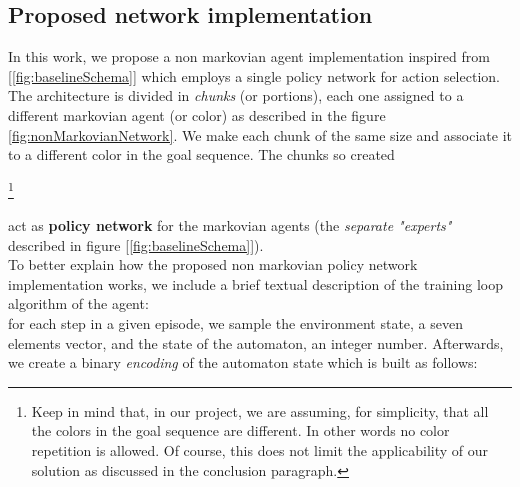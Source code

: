 \documentclass{article}
\begin{document}
\subsection{Proposed network implementation}
In this work, we propose a non markovian agent implementation inspired from [\ref{fig:baselineSchema}] which employs a single policy network for action selection. The architecture is divided in \textit{chunks} (or portions), each one assigned to a different markovian agent (or color) as described in the figure \ref{fig:nonMarkovianNetwork}.
We make each chunk of the same size and associate it to a different color in the goal sequence. The chunks so created


\footnote{Keep in mind that, in our project, we are assuming, for simplicity, that all the colors in the goal sequence are different. In other words no color repetition is allowed. Of course, this does not limit the applicability of our solution as discussed in the conclusion paragraph.} 

act as \textbf{policy network} for the markovian agents (the \textit{separate "experts"} described in figure [\ref{fig:baselineSchema}]). \\
To better explain how the proposed non markovian policy network implementation works, we include a brief textual description of the training loop algorithm of the agent: \\
for each step in a given episode, we sample the environment state, a seven elements vector, and the state of the automaton, an integer number. Afterwards, we create a binary \textit{encoding} of the automaton state which is built as follows:


\end{document}
